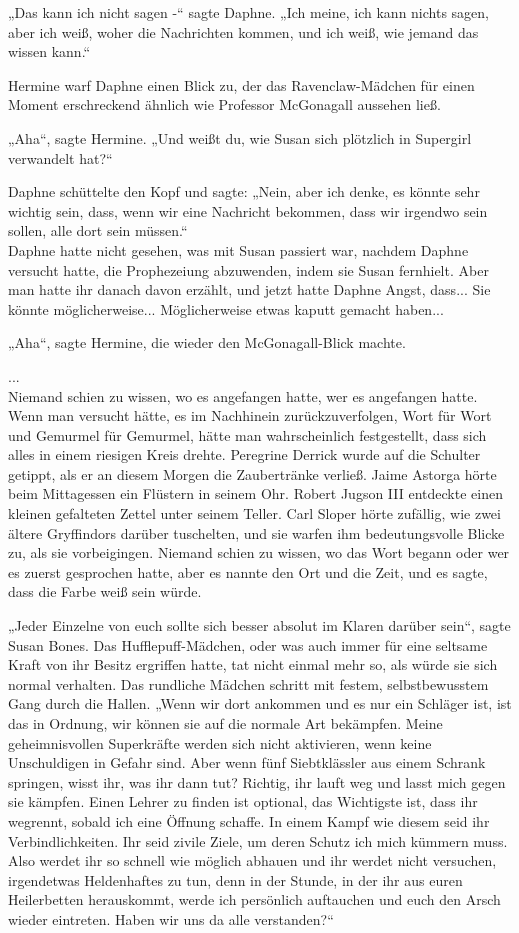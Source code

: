 {„Das kann ich nicht sagen -“ sagte Daphne. „Ich meine, ich kann nichts sagen, aber ich weiß, woher die Nachrichten kommen, und ich weiß, wie jemand das wissen kann.“

Hermine warf Daphne einen Blick zu, der das Ravenclaw-Mädchen für einen Moment erschreckend ähnlich wie Professor McGonagall aussehen ließ.

„Aha“, sagte Hermine. „Und weißt du, wie Susan sich plötzlich in Supergirl verwandelt hat?“

Daphne schüttelte den Kopf und sagte: „Nein, aber ich denke, es könnte sehr wichtig sein, dass, wenn wir eine Nachricht bekommen, dass wir irgendwo sein sollen, alle dort sein müssen.“\\ Daphne hatte nicht gesehen, was mit Susan passiert war, nachdem Daphne versucht hatte, die Prophezeiung abzuwenden, indem sie Susan fernhielt. Aber man hatte ihr danach davon erzählt, und jetzt hatte Daphne Angst, dass... Sie könnte möglicherweise... Möglicherweise etwas kaputt gemacht haben...

„Aha“, sagte Hermine, die wieder den McGonagall-Blick machte.

...\\ Niemand schien zu wissen, wo es angefangen hatte, wer es angefangen hatte. Wenn man versucht hätte, es im Nachhinein zurückzuverfolgen, Wort für Wort und Gemurmel für Gemurmel, hätte man wahrscheinlich festgestellt, dass sich alles in einem riesigen Kreis drehte. Peregrine Derrick wurde auf die Schulter getippt, als er an diesem Morgen die Zaubertränke verließ. Jaime Astorga hörte beim Mittagessen ein Flüstern in seinem Ohr. Robert Jugson III entdeckte einen kleinen gefalteten Zettel unter seinem Teller. Carl Sloper hörte zufällig, wie zwei ältere Gryffindors darüber tuschelten, und sie warfen ihm bedeutungsvolle Blicke zu, als sie vorbeigingen. Niemand schien zu wissen, wo das Wort begann oder wer es zuerst gesprochen hatte, aber es nannte den Ort und die Zeit, und es sagte, dass die Farbe weiß sein würde.

„Jeder Einzelne von euch sollte sich besser absolut im Klaren darüber sein“, sagte Susan Bones. Das Hufflepuff-Mädchen, oder was auch immer für eine seltsame Kraft von ihr Besitz ergriffen hatte, tat nicht einmal mehr so, als würde sie sich normal verhalten. Das rundliche Mädchen schritt mit festem, selbstbewusstem Gang durch die Hallen. „Wenn wir dort ankommen und es nur ein Schläger ist, ist das in Ordnung, wir können sie auf die normale Art bekämpfen. Meine geheimnisvollen Superkräfte werden sich nicht aktivieren, wenn keine Unschuldigen in Gefahr sind. Aber wenn fünf Siebtklässler aus einem Schrank springen, wisst ihr, was ihr dann tut? Richtig, ihr lauft weg und lasst mich gegen sie kämpfen. Einen Lehrer zu finden ist optional, das Wichtigste ist, dass ihr wegrennt, sobald ich eine Öffnung schaffe. In einem Kampf wie diesem seid ihr Verbindlichkeiten. Ihr seid zivile Ziele, um deren Schutz ich mich kümmern muss. Also werdet ihr so schnell wie möglich abhauen und ihr werdet nicht versuchen, irgendetwas Heldenhaftes zu tun, denn in der Stunde, in der ihr aus euren Heilerbetten herauskommt, werde ich persönlich auftauchen und euch den Arsch wieder eintreten. Haben wir uns da alle verstanden?“

}
